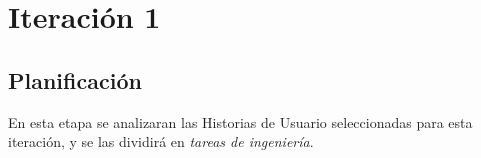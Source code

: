 \section{Iteración 1}
\label{sec:iteracion_1}


%

\subsection{Planificación}

En esta etapa se analizaran las Historias de Usuario seleccionadas para esta iteración, y se las dividirá en \emph{tareas de ingeniería}. \\



%
%

